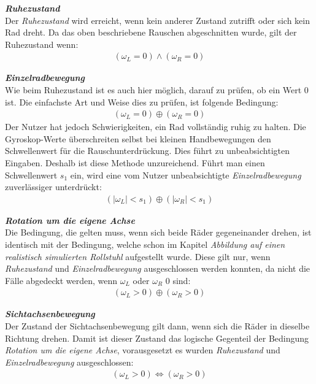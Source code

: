 \textbf{\textit{Ruhezustand}}\\
Der \textit{Ruhezustand} wird erreicht, wenn kein anderer Zustand zutrifft oder sich kein Rad dreht.
Da das oben beschriebene Rauschen abgeschnitten wurde, gilt der Ruhezustand wenn:
\begin{align}
    (\omega_L = 0) \land (\omega_R = 0)
\end{align}

\textbf{\textit{Einzelradbewegung}}\\
Wie beim Ruhezustand ist es auch hier möglich, darauf zu prüfen, ob ein Wert 0 ist.
Die einfachste Art und Weise dies zu prüfen, ist folgende Bedingung:
\begin{align}
    (\omega_L = 0) \oplus (\omega_R = 0)
\end{align}
Der Nutzer hat jedoch Schwierigkeiten, ein Rad vollständig ruhig zu halten.
Die Gyroskop-Werte überschreiten selbst bei kleinen Handbewegungen den Schwellenwert für die Rauschunterdrückung.
Dies führt zu unbeabsichtigten Eingaben.
Deshalb ist diese Methode unzureichend.
Führt man einen Schwellenwert $s_1$ ein, wird eine vom Nutzer unbeabsichtigte \textit{Einzelradbewegung} zuverlässiger unterdrückt:
\begin{align}
    (|\omega_L| < s_1) \oplus (|\omega_R| < s_1)
\end{align}

\textbf{\textit{Rotation um die eigene Achse}}\\
Die Bedingung, die gelten muss, wenn sich beide Räder gegeneinander drehen, ist identisch mit der Bedingung, welche schon im Kapitel \textit{Abbildung auf einen realistisch simulierten Rollstuhl} aufgestellt wurde.
Diese gilt nur, wenn \textit{Ruhezustand} und \textit{Einzelradbewegung} ausgeschlossen werden konnten, da nicht die Fälle abgedeckt werden, wenn $\omega_L$ oder $\omega_R$ 0 sind:
\begin{align}
    (\omega_L > 0) \oplus (\omega_R > 0)
\end{align}

\textbf{\textit{Sichtachsenbewegung}}\\
Der Zustand der Sichtachsenbewegung gilt dann, wenn sich die Räder in dieselbe Richtung drehen.
Damit ist dieser Zustand das logische Gegenteil der Bedingung \textit{Rotation um die eigene Achse}, vorausgesetzt es wurden \textit{Ruhezustand} und \textit{Einzelradbewegung} ausgeschlossen:
\begin{align}
    (\omega_L > 0) \Leftrightarrow (\omega_R > 0)
\end{align}

